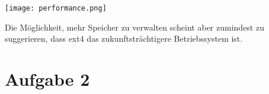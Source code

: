\documentclass[numbers=noendperiod]{scrartcl}
\begin{document}
\begin{minipage}{\textwidth}
	\centering \texttt{[image: performance.png]}
\end{minipage}

Die Möglichkeit, mehr Speicher zu verwalten scheint aber zumindest zu suggerieren, dass ext4 das zukunftsträchtigere Betriebssystem ist.

\section*{Aufgabe 2}


\end{document}

